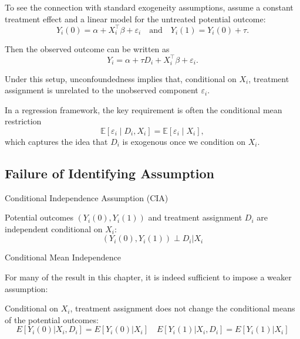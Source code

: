 \documentclass[11pt,aspectratio=169]{beamer}
\begin{document}
\begin{frame}

To see the connection with standard exogeneity assumptions, assume a constant treatment effect and a linear model for the untreated potential outcome:
$$Y_i(0) = \alpha + X_i^\top \beta + \varepsilon_i \quad \text{and} \quad Y_i(1) = Y_i(0) + \tau.$$

Then the observed outcome can be written as
$$Y_i = \alpha + \tau D_i + X_i^\top \beta + \varepsilon_i.$$

Under this setup, unconfoundedness implies that, conditional on $X_i$, treatment assignment is unrelated to the unobserved component $\varepsilon_i$.

In a regression framework, the key requirement is often the conditional mean restriction
$$\mathbb{E}[\varepsilon_i \mid D_i, X_i] = \mathbb{E}[\varepsilon_i \mid X_i],$$
which captures the idea that $D_i$ is exogenous once we condition on $X_i$.
\end{frame}











\subsection{Failure of Identifying Assumption}

\begin{frame}{Conditional Independence Assumption (CIA)}
\begin{definitionbox}[CIA]
Potential outcomes $(Y_i(0),Y_i(1))$ and treatment assignment $D_i$ are independent conditional on $X_i$:
$$(Y_i(0),Y_i(1))\perp D_i \vert X_i$$
\end{definitionbox}
\end{frame}

\begin{frame}{Conditional Mean Independence}

For many of the result in this chapter, it is indeed sufficient to impose a weaker assumption:

\begin{definitionbox}

Conditional on $X_i$, treatment assignment does not change the conditional means of the potential outcomes:
$$E[Y_i(0)\vert X_i,D_i]=E[Y_i(0)\vert X_i] \quad E[Y_i(1)\vert X_i,D_i]=E[Y_i(1)\vert X_i]$$

\end{definitionbox}
\end{frame}
\end{document}
